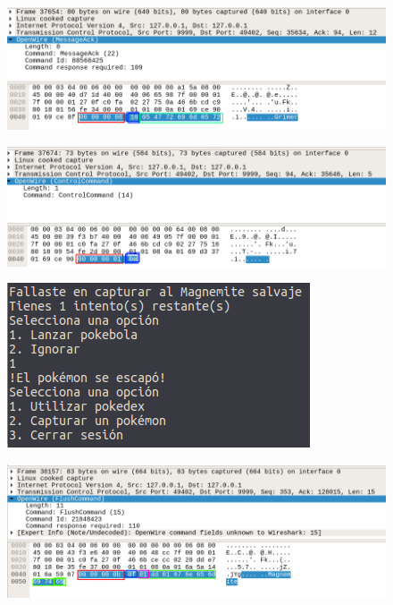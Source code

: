 \documentclass[12pt]{article}
\begin{document}
\begin{figure}[H]
  \centering
  \includegraphics[width=\textwidth]{25}
  \caption{}
\end{figure}

\begin{figure}[H]
  \centering
  \includegraphics[width=\textwidth]{26}
  \caption{}
\end{figure}

\begin{figure}[H]
  \centering
  \includegraphics[width=\textwidth]{27}
  \caption{}
\end{figure}

\begin{figure}[H]
  \centering
  \includegraphics[width=\textwidth]{28}
  \caption{}
\end{figure}
\end{document}
